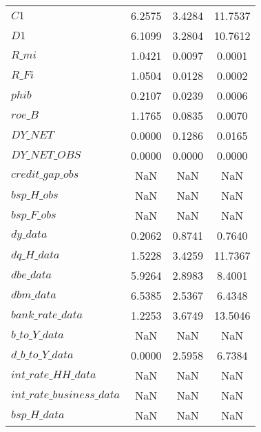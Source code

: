 \begin{center}
\begin{longtable}{lccc}
$C1                         $	 & 	       6.2575	 & 	       3.4284	 & 	      11.7537 \\ 
$D1                         $	 & 	       6.1099	 & 	       3.2804	 & 	      10.7612 \\ 
$R\_mi                      $	 & 	       1.0421	 & 	       0.0097	 & 	       0.0001 \\ 
$R\_Fi                      $	 & 	       1.0504	 & 	       0.0128	 & 	       0.0002 \\ 
$phib                       $	 & 	       0.2107	 & 	       0.0239	 & 	       0.0006 \\ 
$roe\_B                     $	 & 	       1.1765	 & 	       0.0835	 & 	       0.0070 \\ 
$DY\_NET                    $	 & 	       0.0000	 & 	       0.1286	 & 	       0.0165 \\ 
$DY\_NET\_OBS               $	 & 	       0.0000	 & 	       0.0000	 & 	       0.0000 \\ 
$credit\_gap\_obs           $	 & 	          NaN	 & 	          NaN	 & 	          NaN \\ 
$bsp\_H\_obs                $	 & 	          NaN	 & 	          NaN	 & 	          NaN \\ 
$bsp\_F\_obs                $	 & 	          NaN	 & 	          NaN	 & 	          NaN \\ 
$dy\_data                   $	 & 	       0.2062	 & 	       0.8741	 & 	       0.7640 \\ 
$dq\_H\_data                $	 & 	       1.5228	 & 	       3.4259	 & 	      11.7367 \\ 
$dbe\_data                  $	 & 	       5.9264	 & 	       2.8983	 & 	       8.4001 \\ 
$dbm\_data                  $	 & 	       6.5385	 & 	       2.5367	 & 	       6.4348 \\ 
$bank\_rate\_data           $	 & 	       1.2253	 & 	       3.6749	 & 	      13.5046 \\ 
$b\_to\_Y\_data             $	 & 	          NaN	 & 	          NaN	 & 	          NaN \\ 
$d\_b\_to\_Y\_data          $	 & 	       0.0000	 & 	       2.5958	 & 	       6.7384 \\ 
$int\_rate\_HH\_data        $	 & 	          NaN	 & 	          NaN	 & 	          NaN \\ 
$int\_rate\_business\_data  $	 & 	          NaN	 & 	          NaN	 & 	          NaN \\ 
$bsp\_H\_data               $	 & 	          NaN	 & 	          NaN	 & 	          NaN \\ 

\end{longtable}
\end{center}
